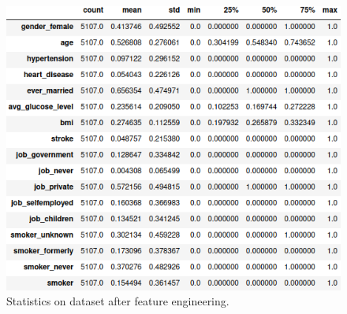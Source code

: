 \begin{figure}[H]
\centering
\includegraphics[scale=0.6]{figures/dataset_describe_final.png}
\caption{Statistics on dataset after feature engineering.}
\label{figure_describe_final}
\end{figure}

